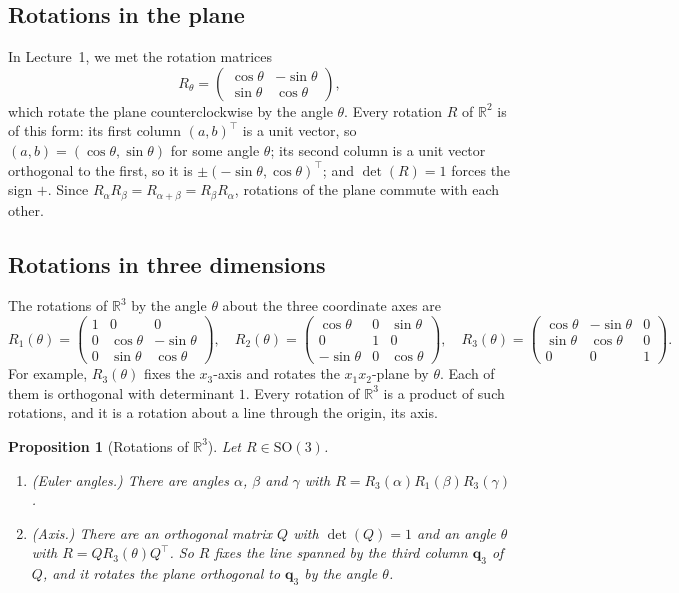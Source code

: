 \documentclass[11pt]{article}
\theoremstyle{definition}
\theoremstyle{plain}
\newtheorem{proposition}[definition]{Proposition}
\theoremstyle{remark}
\begin{document}
\subsection{Rotations in the plane}

In Lecture~1, we met the rotation matrices
\[R_\theta = \begin{pmatrix} \cos\theta & -\sin\theta \\ \sin\theta & \cos\theta \end{pmatrix},\]
which rotate the plane counterclockwise by the angle $\theta$. Every rotation $R$ of $\mathbb{R}^2$ is of this form: its first column $(a, b)^\top$ is a unit vector, so $(a, b) = (\cos\theta, \sin\theta)$ for some angle $\theta$; its second column is a unit vector orthogonal to the first, so it is $\pm(-\sin\theta, \cos\theta)^\top$; and $\det(R) = 1$ forces the sign $+$. Since $R_\alpha R_\beta = R_{\alpha + \beta} = R_\beta R_\alpha$, rotations of the plane commute with each other.

\subsection{Rotations in three dimensions}

The rotations of $\mathbb{R}^3$ by the angle $\theta$ about the three coordinate axes are
\[R_1(\theta) = \begin{pmatrix} 1 & 0 & 0 \\ 0 & \cos\theta & -\sin\theta \\ 0 & \sin\theta & \cos\theta \end{pmatrix}, \quad R_2(\theta) = \begin{pmatrix} \cos\theta & 0 & \sin\theta \\ 0 & 1 & 0 \\ -\sin\theta & 0 & \cos\theta \end{pmatrix}, \quad R_3(\theta) = \begin{pmatrix} \cos\theta & -\sin\theta & 0 \\ \sin\theta & \cos\theta & 0 \\ 0 & 0 & 1 \end{pmatrix}.\]
For example, $R_3(\theta)$ fixes the $x_3$-axis and rotates the $x_1 x_2$-plane by $\theta$. Each of them is orthogonal with determinant $1$. Every rotation of $\mathbb{R}^3$ is a product of such rotations, and it is a rotation about a line through the origin, its axis.

\begin{proposition}[Rotations of $\mathbb{R}^3$]\label{prop:rotations-3d}
    Let $R \in \mathrm{SO}(3)$.
    \begin{enumerate}
        \item (Euler angles.) There are angles $\alpha$, $\beta$ and $\gamma$ with $R = R_3(\alpha)R_1(\beta)R_3(\gamma)$.
        \item (Axis.) There are an orthogonal matrix $Q$ with $\det(Q) = 1$ and an angle $\theta$ with $R = QR_3(\theta)Q^\top$. So $R$ fixes the line spanned by the third column $\mathbf{q}_3$ of $Q$, and it rotates the plane orthogonal to $\mathbf{q}_3$ by the angle $\theta$.
    \end{enumerate}
\end{proposition}
\end{document}

